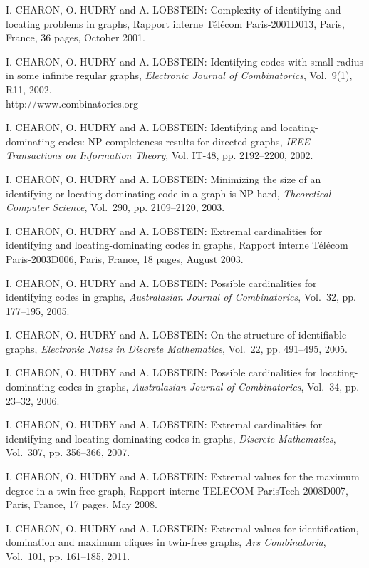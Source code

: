 \begin{thebibliography}{999}
I. CHARON, O. HUDRY and A. LOBSTEIN: Complexity of identifying and locating problems in graphs, Rapport interne T\'el\'ecom Paris-2001D013, Paris, France, 36 pages, October 2001.

I. CHARON, O. HUDRY and A. LOBSTEIN: Identifying codes with small radius in some infinite regular graphs, {\it Electronic Journal of Combinatorics}, Vol.~9(1), R11, 2002.\\
http://www.combinatorics.org

I. CHARON, O. HUDRY and A. LOBSTEIN: Identifying and locating-dominating codes: NP-completeness results for directed graphs, {\it IEEE Transactions on Information Theory}, Vol. IT-48, pp. 2192--2200, 2002.

I. CHARON, O. HUDRY and A. LOBSTEIN: Minimizing the size of an identifying or locating-dominating code in a graph is NP-hard, {\it Theoretical Computer Science}, Vol.~290, pp. 2109--2120, 2003.

I. CHARON, O. HUDRY and A. LOBSTEIN: Extremal cardinalities for identifying and locating-dominating codes in graphs, Rapport interne T\'el\'ecom Paris-2003D006, Paris, France, 18 pages, August 2003.

I. CHARON, O. HUDRY and A. LOBSTEIN: Possible cardinalities for identifying codes in graphs, {\it Australasian Journal of Combinatorics}, Vol.~32, pp. 177--195, 2005.

I. CHARON, O. HUDRY and A. LOBSTEIN: On the structure of identifiable graphs, {\it Electronic Notes in Discrete Mathematics}, Vol.~22, pp. 491--495, 2005.

I. CHARON, O. HUDRY and A. LOBSTEIN: Possible cardinalities for locating-dominating codes in graphs, {\it Australasian Journal of Combinatorics}, Vol.~34, pp. 23--32, 2006.

I. CHARON, O. HUDRY and A. LOBSTEIN: Extremal cardinalities for identifying and locating-dominating codes in graphs, {\it Discrete Mathematics}, Vol.~307, pp. 356--366, 2007.

I. CHARON, O. HUDRY and A. LOBSTEIN: Extremal values for the maximum degree in a twin-free graph, Rapport interne TELECOM ParisTech-2008D007, Paris, France, 17 pages, May 2008.

I. CHARON, O. HUDRY and A. LOBSTEIN: Extremal values for identification, domination and maximum cliques in twin-free graphs, {\it Ars Combinatoria}, Vol.~101, pp. 161--185, 2011.


\end{thebibliography}
